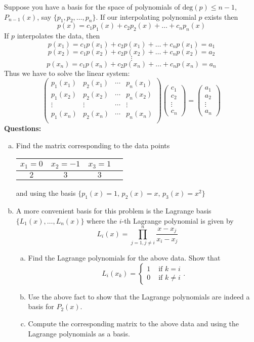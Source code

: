 \documentclass[12pt,letterpaper]{article}
\theoremstyle{plain}
\theoremstyle{definition}
\begin{document}
\begin{enumerate}[1.]
Suppose you have a basis for the space of polynomials of $\text{deg}(p)\leq n-1$, $P_{n-1}(x)$, say $\{p_1, p_2, \ldots, p_n\}$. If our interpolating polynomial $p$ exists then 
\[p(x)=c_1p_1(x)+c_2p_2(x)+\ldots+c_np_n(x)\]
If $p$ interpolates the data, then 
\[p(x_1)=c_1p(x_1)+c_2p(x_1)+\ldots+c_np(x_1)= a_1\]
\[p(x_2)=c_1p(x_2)+c_2p(x_2)+\ldots+c_np(x_2)= a_2\]
\[\vdots\]
\[p(x_n)=c_1p(x_n)+c_2p(x_n)+\ldots+c_np(x_n)= a_n\]
Thus we have to solve the linear system:
\[\begin{pmatrix}
p_1(x_1) & p_2(x_1) & \cdots & p_n(x_1)\\
p_1(x_2) & p_2(x_2) & \cdots & p_n(x_2)\\
\vdots & \vdots & \cdots & \vdots\\
p_1(x_n) & p_2(x_n) & \cdots & p_n(x_n)\\
\end{pmatrix}
\begin{pmatrix}
c_1\\
c_2\\
\vdots \\
c_n
\end{pmatrix}=
\begin{pmatrix}
a_1\\
a_2\\
\vdots \\
a_n
\end{pmatrix}
\]
\newpage
{\noindent \bf Questions:}
\begin{enumerate}[(a)]
\item Find the matrix corresponding to the data points 
\begin{center}
\begin{tabular}{|c|c|c|c|}
\hline
$x_1=0$& $x_2=-1$& $x_3=1$\\ \hline
$2$& $3$& $3$\\
\hline
\end{tabular}
\end{center}
and using the basis $\{p_1(x)=1,\, p_2(x)=x,\, p_3(x)=x^2\}$

\item A more convenient basis for this problem is the Lagrange basis $\{L_1(x), \ldots, L_n(x)\}$ where the $i$-th Lagrange polynomial is given by 
\[L_i(x)=\prod_{j=1, j\neq i}^n \frac{x-x_j}{x_i-x_j}\]

\begin{enumerate}[b.1)]
\item Find the Lagrange polynomials for the above data. Show that 
\[L_i(x_k)=\left\{\begin{array}{cl}1 & \text{ if }k=i\\ 0 & \text{ if }k\neq i\end{array}\right..\]
\item Use the above fact to show that the Lagrange polynomials are indeed a basis for $P_2(x)$. 
\item Compute the corresponding matrix to the above data and using the Lagrange polynomials as a basis. 
\end{enumerate}

\end{enumerate}

\end{enumerate}
\end{document}
